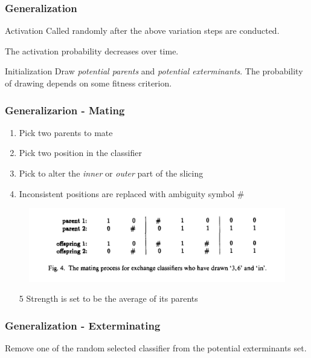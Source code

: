 \begin{frame}
    \frametitle{Generalization}
    \begin{block}{Activation}
        Called randomly after the above variation steps are conducted.

        The activation probability decreases over time.
    \end{block}

    \begin{block}{Initialization}
        Draw \emph{potential parents} and \emph{potential exterminants}. 
        The probability of drawing depends on some fitness criterion.
    \end{block}

\end{frame}

\begin{frame}
    \frametitle{Generalizarion - Mating}
    \begin{enumerate}
        \item Pick two parents to mate
        \item Pick two position in the classifier
        \item Pick to alter the \emph{inner} or \emph{outer} part of the slicing
        \item Inconsistent positions are replaced with ambiguity symbol \# 
    \end{enumerate}
        \begin{figure}
            \centering
            \includegraphics[width=\textwidth]{img/fig3_mating.jpg}
        \end{figure}
        \begin{enumerate}
            \item[5] Strength is set to be the average of its parents
        \end{enumerate}    

\end{frame}

\begin{frame}
    \frametitle{Generalization - Exterminating}

    Remove one of the random selected classifier from the potential exterminants set.
    
\end{frame}